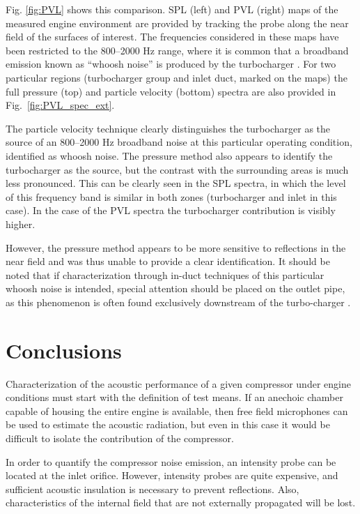 Fig. \ref{fig:PVL} shows this comparison. SPL (left) and PVL (right) maps of the measured engine environment are provided by tracking the probe along the near field of the surfaces of interest. The frequencies considered in these maps have been restricted to the 800--2000 Hz range, where it is common that a broadband emission known as ``whoosh noise'' is produced by the turbocharger \cite{evans2005minimizing}. For two particular regions (turbocharger group and inlet duct, marked on the maps) the full pressure (top) and particle velocity (bottom) spectra are also provided in Fig.~\ref{fig:PVL_spec_ext}.

The particle velocity technique clearly distinguishes the turbocharger as the source of an 800--2000 Hz broadband noise at this particular operating condition, identified as whoosh noise. The pressure method also appears to identify the turbocharger as the source, but the contrast with the surrounding areas is much less pronounced. This can be clearly seen in the SPL spectra, in which the level of this frequency band is similar in both zones (turbocharger and inlet in this case). In the case of the PVL spectra the turbocharger contribution is visibly higher.

However, the pressure method appears to be more sensitive to reflections in the near field and was thus unable to provide a clear identification. It should be noted that if characterization through in-duct techniques of this particular whoosh noise is intended, special attention should be placed on the outlet pipe, as this phenomenon is often found exclusively downstream of the turbo-charger \cite{broatch2014methodology}.

\section{Conclusions}
\label{sec:conclusions}

Characterization of the acoustic performance of a given compressor under engine conditions must start with the definition of test means. If an anechoic chamber capable of housing the entire engine is available, then free field microphones can be used to estimate the acoustic radiation, but even in this case it would be difficult to isolate the contribution of the compressor.

In order to quantify the compressor noise emission, an intensity probe can be located at the inlet orifice. However, intensity probes are quite expensive, and sufficient acoustic insulation is necessary to prevent reflections. Also, characteristics of the internal field that are not externally propagated will be lost.

